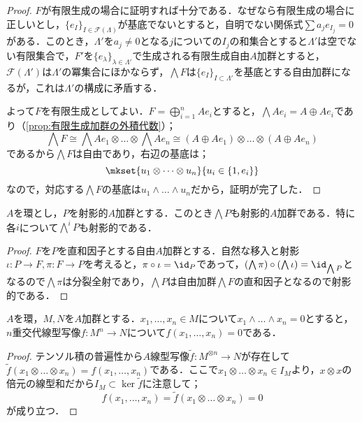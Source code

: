 \begin{proof}
	$F$が有限生成の場合に証明すれば十分である．なぜなら有限生成の場合に正しいとし，$\{e_I\}_{I\in\mathcal{F}(\Lambda)}$が基底でないとすると，自明でない関係式$\sum a_je_{I_j}=0$がある．このとき，$\Lambda'$を$a_j\neq0$となる$j$についての$I_j$の和集合とすると$\Lambda'$は空でない有限集合で，$F'$を$\{e_\lambda\}_{\lambda\in\Lambda'}$で生成される有限生成自由$A$加群とすると，$\mathcal{F}(\Lambda')$は$\Lambda'$の冪集合にほかならず，$\bigwedge F$は$\{e_I\}_{I\subset\Lambda'}$を基底とする自由加群になるが，これは$\Lambda'$の構成に矛盾する．
	
	よって$F$を有限生成としてよい．$F=\bigoplus_{i=1}^n Ae_i$とすると，$\bigwedge Ae_i=A\oplus Ae_i$であり（\ref{prop:有限生成加群の外積代数}）；
	\[\bigwedge F\cong \bigwedge Ae_1\otimes\dots\otimes\bigwedge Ae_n\cong(A\oplus Ae_1)\otimes\dots\otimes(A\oplus Ae_n)\]
	であるから$\bigwedge F$は自由であり，右辺の基底は；
	\[\mkset{u_1\otimes\dots\otimes u_n}{u_i\in\{1,e_i\}}\]
	なので，対応する$\bigwedge F$の基底は$u_1\wedge\dots\wedge u_n$だから，証明が完了した．
\end{proof}

\begin{cor}\label{cor:wedge Pもprojective}
	$A$を環とし，$P$を射影的$A$加群とする．このとき$\bigwedge P$も射影的$A$加群である．特に各$i$について$\bigwedge^i P$も射影的である．
\end{cor}

\begin{proof}
	$F$を$P$を直和因子とする自由$A$加群とする．自然な移入と射影$\iota:P\to F,\pi:F\to P$を考えると，$\pi\circ\iota=\id_P$であって，$(\bigwedge\pi)\circ(\bigwedge\iota)=\id_{\bigwedge P}$となるので$\bigwedge\pi$は分裂全射であり，$\bigwedge P$は自由加群$\bigwedge F$の直和因子となるので射影的である．
\end{proof}

\begin{lem}
	$A$を環，$M,N$を$A$加群とする．$x_1,\dots,x_n\in M$について$x_1\wedge\dots\wedge x_n=0$とすると，$n$重交代線型写像$f:M^n\to N$について$f(x_1,\dots,x_n)=0$である．
\end{lem}

\begin{proof}
	テンソル積の普遍性から$A$線型写像$\widetilde{f}:M^{\otimes n}\to N$が存在して$\widetilde{f}(x_1\otimes\dots\otimes x_n)=f(x_1,\dots,x_n)$である．ここで$x_1\otimes\dots\otimes x_n\in I_M$より，$x\otimes x$の倍元の線型和だから$I_M\subset\ker\widetilde{f}$に注意して；
	\[f(x_1,\dots,x_n)=\widetilde{f}(x_1\otimes\dots\otimes x_n)=0\]
	が成り立つ．
\end{proof}

